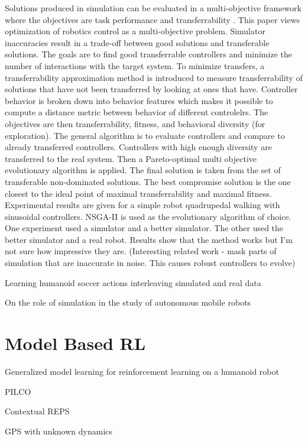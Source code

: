 \documentclass[12 pt]{article}
\begin{document}
Solutions produced in simulation can be evaluated in a multi-objective framework where the objectives are task performance and transferrability \cite{koos2010crossing}. 
This paper views optimization of robotics control as a multi-objective problem. Simulator inaccuracies result in a trade-off between good solutions and transferable solutions. The goals are to find good transferrable controllers and minimize the number of interactions with the target system. To minimize transfers, a transferrability approximation method is introduced to measure transferrability of solutions that have not been transferred by looking at ones that have. Controller behavior is broken down into behavior features which makes it possible to compute a distance metric between behavior of different controlelrs. The objectives are then transferrability, fitness, and behavioral diversity (for exploration). The general algorithm is to evaluate controllers and compare to already transferred controllers. Controllers with high enough diversity are transferred to the real system. Then a Pareto-optimal multi objective evolutionary algorithm is applied. The final solution is taken from the set of transferable non-dominated solutions. The best compromise solution is the one closest to the ideal point of maximal transferrability and maximal fitness. Experimental results are given for a simple robot quadrupedal walking with sinusoidal controllers. NSGA-II is used as the evolutionary algorithm of choice. One experiment used a simulator and a better simulator. The other used the better simulator and a real robot. Results show that the method works but I'm not sure how impressive they are. (Interesting related work - mask parts of simulation that are inaccurate in noise. This causes robust controllers to evolve)

Learning humanoid soccer actions interleaving simulated and real data

On the role of simulation in the study of autonomous mobile robots

\section{Model Based RL}
Generalized model learning for reinforcement learning on a humanoid robot

PILCO \cite{deisenroth2011pilco}

Contextual REPS \cite{kupcsik2013data}

GPS with unknown dynamics \cite{levine2014learning}
\end{document}
